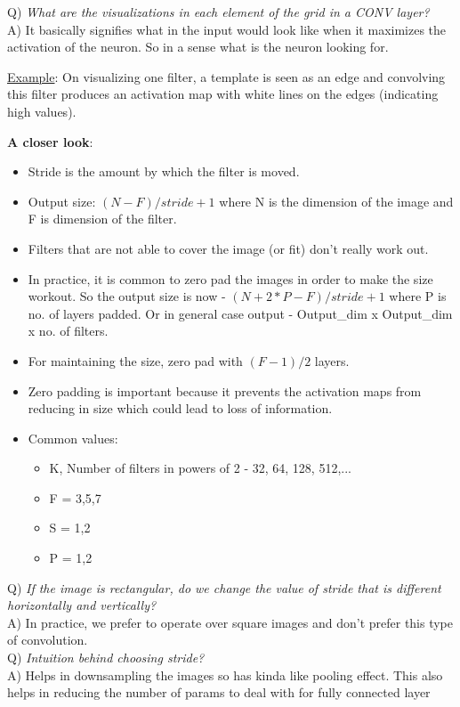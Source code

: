 \documentclass[twoside]{article}
\begin{document}
Q) \textit{What are the visualizations in each element of the grid in a CONV layer?}\\
A) It basically signifies what in the input would look like when it maximizes the activation of the neuron. So in a sense what is the neuron looking for.

\underline{Example}: On visualizing one filter, a template is seen as an edge and convolving this filter produces an activation map with white lines on the edges (indicating high values).

\textbf{A closer look}:
\begin{itemize}
    \item Stride is the amount by which the filter is moved.
    \item Output size: $(N-F)/stride + 1$ where N is the dimension of the image and F is dimension of the filter.
    \item Filters that are not able to cover the image (or fit) don't really work out.
    \item In practice, it is common to zero pad the images in order to make the size workout. So the output size is now - $(N +2*P -F)/stride + 1$ where P is no. of layers padded. Or in general case output - Output\_dim  x Output\_dim x no. of filters.
    \item For maintaining the size, zero pad with $(F-1)/2$ layers.
    \item Zero padding is important because it prevents the activation maps from reducing in size which could lead to loss of information.
    \item Common values:
    \begin{itemize}
        \item K, Number of filters in powers of 2 - 32, 64, 128, 512,...
        \item F = 3,5,7
        \item S = 1,2
        \item P = 1,2
    \end{itemize}
\end{itemize}

Q) \textit{If the image is rectangular, do we change the value of stride that is different horizontally and vertically?}\\
A) In practice, we prefer to operate over square images and don't prefer this type of convolution.\\

Q) \textit{Intuition behind choosing stride?}\\
A) Helps in downsampling the images so has kinda like pooling effect. This also helps in reducing the number of params to deal with for fully connected layer
\end{document}

